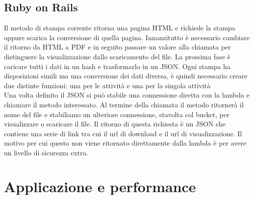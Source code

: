 \documentclass[12pt]{article}
\begin{document}
\subsection{Ruby on Rails}
Il metodo di stampa corrente ritorna una pagina HTML e richiede la stampa oppure 
scarica la conversione di quella pagina. Innanzitutto è necessario cambiare il 
ritorno da HTML a PDF e in seguito passare un valore alla chiamata per distinguere 
la visualizzazione dallo scaricamento del file. 
La prossima fase è caricare tutti i dati in un hash e trasformarlo in un JSON. 
Ogni stampa ha disposizioni simili ma una conversione dei dati diversa, è quindi 
necessario creare due distinte funzioni: una per le attività e una per la singola 
attività
\\ Una volta definito il JSON si può stabile una connessione diretta con la lambda e 
chiamare il metodo interessato.
Al termine della chiamata il metodo ritornerà il nome del file e stabiliamo un
ulteriore connessione, stavolta col bucket, per visualizzare o scaricare il file.
Il ritorno di questa richiesta è un JSON che
contiene una serie di link tra cui il url di download e il url di visualizzazione.
Il motivo per cui questo non viene ritornato direttamente dalla lambda è per avere 
un livello di sicurezza extra. 

\section{Applicazione e performance}
\end{document}
